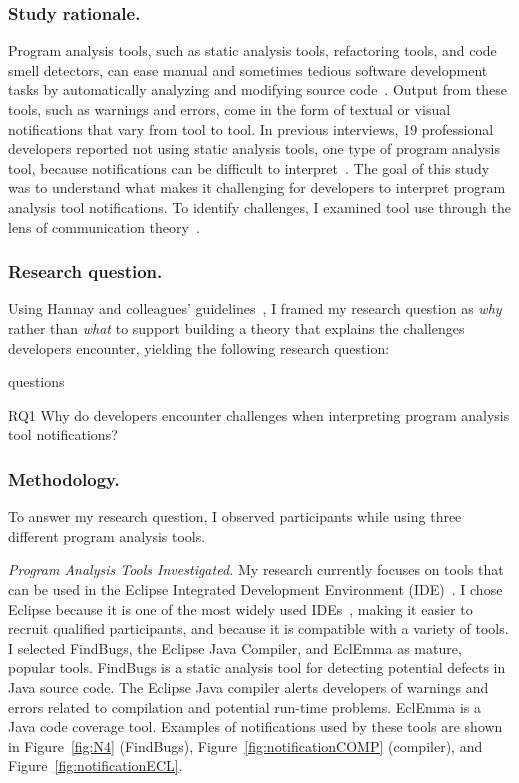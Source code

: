 \documentclass{llncs}
\begin{document}
\subsubsection{Study rationale.} Program analysis tools, such as static analysis tools, refactoring tools, and code smell detectors, can ease manual and sometimes tedious software development tasks by automatically analyzing and modifying source code~\cite{adolph2011using,Murphy-Hill:2010:Ambient}. 
Output from these tools, such as warnings and errors, come in the form of textual or visual notifications that vary from tool to tool.
In previous interviews, 19 professional developers reported not using static analysis tools, one type of program analysis tool, because notifications can be difficult to interpret~\cite{johnson2013don}. The goal of this study was to understand what makes it challenging for developers to interpret program analysis tool notifications. To identify challenges, I examined tool use through the lens of communication theory~\cite{bowman1987modeling}. 

\subsubsection{Research question.}
Using Hannay and colleagues' guidelines~\cite{hannay2007systematic}, I framed my research question as \emph{why} rather than \emph{what} to support building a theory that explains the challenges developers encounter, yielding the following research question:

\begin{labeling}{questions}
	\item [RQ1] Why do developers encounter challenges when interpreting program analysis tool notifications? 
\end{labeling}



\subsubsection{Methodology.} To answer my research question, I observed participants while using three different program analysis tools.

\vspace{0.5em}
\noindent\textit{Program Analysis Tools Investigated.}
My research currently focuses on tools that can be used in the Eclipse Integrated Development Environment (IDE)~\cite{EclipseIDE}. I chose Eclipse because it is one of the most widely used IDEs~\cite{Goth:2005:Beware}, making it easier to recruit qualified participants, and because it is compatible with a variety of tools. I selected FindBugs, the Eclipse Java Compiler, and EclEmma as mature, popular tools. FindBugs is a static analysis tool for detecting potential defects in Java source code. The Eclipse Java compiler alerts developers of warnings and errors related to compilation and potential run-time problems. EclEmma is a Java code coverage tool. Examples of notifications used by these tools are shown in Figure~\ref{fig:N4} (FindBugs), Figure~\ref{fig:notificationCOMP} (compiler), and Figure~\ref{fig:notificationECL}.
\end{document}
